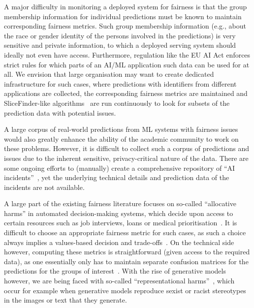  A major difficulty in monitoring a deployed system for fairness is that the group membership information for individual predictions must be known to maintain corresponding fairness metrics. Such group membership information (e.g., about the race or gender identity of the persons involved in the predictions) is very sensitive and private information, to which a deployed serving system should ideally not even have access. Furthermore, regulation like the EU AI Act enforces strict rules for which parts of an AI/ML application such data can be used for at all. We envision that large organisation may want to create dedicated infrastructure for such cases, where predictions with identifiers from different applications are collected, the corresponding fairness metrics are maintained and SliceFinder-like algorithms~\cite{chung2019slice} are run continuously to look for subsets of the prediction data with potential issues.

A large corpus of real-world predictions from ML systems with fairness issues would also greatly enhance the ability of the academic community to work on these problems. However, it is difficult to collect such a corpus of predictions and issues due to the inherent sensitive, privacy-critical nature of the data. There are some ongoing efforts to (manually) create a comprehensive repository of ``AI incidents''~\cite{mcgregor2021preventing}, yet the underlying technical details and prediction data of the incidents are not available.


 A large part of the existing fairness literature focuses on so-called ``allocative harms'' in automated decision-making systems, which decide upon access to certain resources such as job interviews, loans or medical prioritisation~\cite{stoyanovich2022responsible,holstein2019improving}. It is difficult to choose an appropriate fairness metric for such cases, as such a choice always implies a values-based decision and trade-offs~\cite{narayanan21fairness}. On the technical side however, computing these metrics is straightforward (given access to the required data), as one essentially only has to maintain separate confusion matrices for the predictions for the groups of interest~\cite{guha2024automated}. With the rise of generative models however, we are being faced with so-called ``representational harms''~\cite{holstein2019improving}, which occur for example when generative models reproduce sexist or racist stereotypes in the images or text that they generate. 


